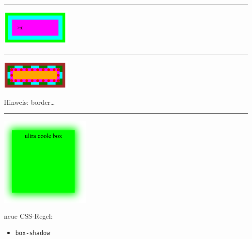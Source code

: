 \documentclass[11pt]{article}
\begin{document}
    \vspace{0.5cm}
    \hrule
    \vspace{0.5cm}

    \begin{minipage}{0.4\textwidth}
        \includegraphics[width=3.5cm]{css5} \\
    \end{minipage}
    \hspace{0.1\textwidth}
    \begin{minipage}{0.4\textwidth}
    \end{minipage}

    \vspace{0.5cm}
    \hrule
    \vspace{0.5cm}

    \begin{minipage}{0.4\textwidth}
        \includegraphics[width=3.5cm]{css6} \\
    \end{minipage}
    \hspace{0.1\textwidth}
    \begin{minipage}{0.4\textwidth}
        Hinweis: border\dots \\
    \end{minipage}

    \vspace{0.5cm}
    \hrule
    \vspace{0.5cm}

    \begin{minipage}{0.4\textwidth}
        \includegraphics[width=4.5cm]{css7} \\
    \end{minipage}
    \hspace{0.1\textwidth}
    \begin{minipage}{0.4\textwidth}
        neue CSS-Regel:
        \begin{itemize}
            \item \Verb"box-shadow"
        \end{itemize}
    \end{minipage}
\end{document}
